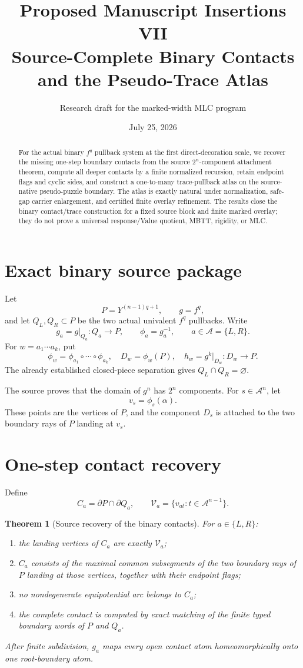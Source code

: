 \documentclass[11pt]{article}
\title{Proposed Manuscript Insertions VII\\
Source-Complete Binary Contacts and the Pseudo-Trace Atlas}
\author{Research draft for the marked-width MLC program}
\date{July 25, 2026}
\newtheorem{theorem}{Theorem}[section]
\theoremstyle{definition}
\theoremstyle{remark}
\newcommand{\A}{\mathcal A}
\begin{document}
\maketitle

\begin{abstract}
For the actual binary $f^q$ pullback system at the first direct-decoration
scale, we recover the missing one-step boundary contacts from the source
$2^n$-component attachment theorem, compute all deeper contacts by a finite
normalized recursion, retain endpoint flags and cyclic sides, and construct a
one-to-many trace-pullback atlas on the source-native pseudo-puzzle boundary.
The atlas is exactly natural under normalization, safe-gap carrier enlargement,
and certified finite overlay refinement.  The results close the binary
contact/trace construction for a fixed source block and finite marked overlay;
they do not prove a universal response/Value quotient, MBTT, rigidity, or MLC.
\end{abstract}

\section{Exact binary source package}
Let
\[
 P=Y^{(n-1)q+1},\qquad g=f^q,
\]
and let $Q_L,Q_R\subset P$ be the two actual univalent $f^q$ pullbacks.
Write
\[
 g_a=g|_{Q_a}:Q_a\to P,\qquad \phi_a=g_a^{-1},\qquad a\in\A=\{L,R\}.
\]
For $w=a_1\cdots a_k$, put
\[
 \phi_w=\phi_{a_1}\circ\cdots\circ\phi_{a_k},\quad
 D_w=\phi_w(P),\quad h_w=g^k|_{D_w}:D_w\to P.
\]
The already established closed-piece separation gives $Q_L\cap Q_R=\varnothing$.

The source proves that the domain of $g^n$ has $2^n$ components.  For
$s\in\A^n$, let
\[
 v_s=\phi_s(\alpha).
\]
These points are the vertices of $P$, and the component $D_s$ is attached to
the two boundary rays of $P$ landing at $v_s$.

\section{One-step contact recovery}
Define
\[
 C_a=\partial P\cap\partial Q_a,
 \qquad
 \mathcal V_a=\{v_{at}:t\in\A^{n-1}\}.
\]

\begin{theorem}[Source recovery of the binary contacts]
For $a\in\{L,R\}$:
\begin{enumerate}
\item the landing vertices of $C_a$ are exactly $\mathcal V_a$;
\item $C_a$ consists of the maximal common subsegments of the two boundary
rays of $P$ landing at those vertices, together with their endpoint flags;
\item no nondegenerate equipotential arc belongs to $C_a$;
\item the complete contact is computed by exact matching of the finite typed
boundary words of $P$ and $Q_a$.
\end{enumerate}
After finite subdivision, $g_a$ maps every open contact atom homeomorphically
onto one root-boundary atom.
\end{theorem}
\end{document}
